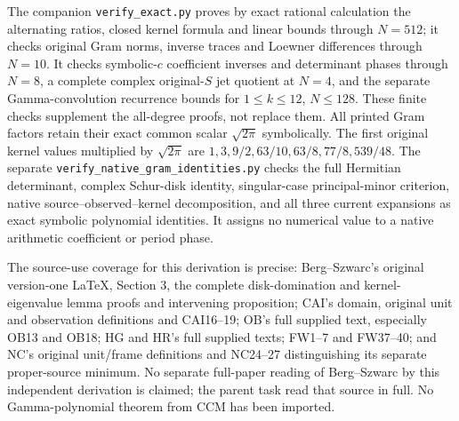 The companion \texttt{verify\_exact.py} proves by exact rational
calculation the alternating ratios, closed kernel formula and linear
bounds through $N=512$; it checks original Gram norms, inverse traces
and Loewner differences through $N=10$.  It checks symbolic-$c$
coefficient inverses and determinant phases through $N=8$, a complete
complex original-$S$ jet quotient at $N=4$, and the separate
Gamma-convolution recurrence bounds for $1\le k\le12$, $N\le128$.
These finite checks supplement the all-degree proofs, not replace them.
All printed Gram factors retain their exact common scalar
$\sqrt{2\pi}$ symbolically.  The first original kernel values multiplied
by $\sqrt{2\pi}$ are $1,3,9/2,63/10,63/8,77/8,539/48$.
The separate \texttt{verify\_native\_gram\_identities.py} checks the full
Hermitian determinant, complex Schur-disk identity, singular-case
principal-minor criterion, native source--observed--kernel decomposition,
and all three current expansions as exact symbolic polynomial identities.
It assigns no numerical value to a native arithmetic coefficient or
period phase.

The source-use coverage for this derivation is precise: Berg--Szwarc's
original version-one \LaTeX, Section 3, the complete disk-domination
and kernel-eigenvalue lemma proofs and intervening proposition; CAI's
domain, original unit and observation definitions and CAI16--19;
OB's full supplied text, especially OB13 and OB18; HG and HR's full
supplied texts; FW1--7 and FW37--40; and NC's original unit/frame
definitions and NC24--27 distinguishing its separate proper-source
minimum.  No separate full-paper reading of Berg--Szwarc by this
independent derivation is claimed; the parent task read that source in
full.  No Gamma-polynomial theorem from CCM has been imported.

